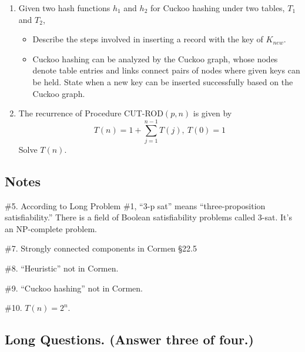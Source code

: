 \begin{enumerate}
	
	\item Given two hash functions $h_1$ and $h_2$ for Cuckoo hashing under two tables, $T_1$ and $T_2$, 
	\begin{itemize}
		\item Describe the steps involved in inserting a record with the key of $K_{new}$.
		\item Cuckoo hashing can be analyzed by the Cuckoo graph, whose nodes denote table entries and links connect pairs of nodes where given keys can be held.  State when a new key can be inserted successfully based on the Cuckoo graph.
	\end{itemize}
	
	
	\item The recurrence of Procedure CUT-ROD$(p,n)$ is given by 
	$$T(n) = 1 + \sum_{j=1}^{n-1} T(j), \ T(0) = 1$$
	Solve $T(n)$.  
	
	
\end{enumerate}

\subsection{Notes}

	\#5.  According to Long Problem \#1, ``3-p sat'' means ``three-proposition satisfiability.'' There is a field of Boolean satisfiability problems called 3-sat.  It's an NP-complete problem.  
	
	\#7.  Strongly connected components in Cormen \S 22.5
	
	\#8.  ``Heuristic'' not in Cormen.
	
	\#9.  ``Cuckoo hashing'' not in Cormen.
	
	\#10.  $T(n) = 2^n$.  
	
\subsection{Long Questions.  (Answer three of four.)}

